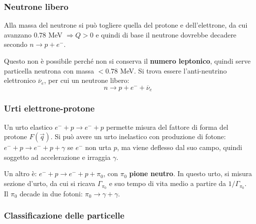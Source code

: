 \documentclass[10pt, a4paper]{scrartcl}
\numberwithin{equation}{subsection}
\theoremstyle{style1}
\begin{document}
\subsubsection{Neutrone libero}

Alla massa del neutrone si pu\`o togliere quella del protone e dell'elettrone, da cui avanzano $0.78$ MeV $\Rightarrow Q>0$ e quindi di base il neutrone dovrebbe decadere secondo $n \to  p + e^-$.

Questo non \`e possibile perch\'e non si conserva il \textbf{numero leptonico}, quindi serve particella neutrona con massa $<0.78$ MeV. Si trova essere l'anti-neutrino elettronico $\overline{\nu }_e$, per cui un neutrone libero:
\begin{equation}
	n \to p+e^- + \overline{\nu }_e
\end{equation}
\subsubsection{Urti elettrone-protone}
Un urto elastico $e^- + p \to e^- + p$ permette misura del fattore di forma del protone $F(\vec{q})$. Si pu\`o avere un urto inelastico con produzione di fotone: $e^- + p \to e^- + p + \gamma$ se $e^-$ non urta $p$, ma viene deflesso dal suo campo, quindi soggetto ad accelerazione e irraggia $\gamma$.

Un altro \`e: $e^- + p \to e^- + p + \pi_0$, con $\pi_0$ \textbf{pione neutro}. In questo urto, si misura sezione d'urto, da cui si ricava $\Gamma_{\pi_0} $ e suo tempo di vita medio a partire da $1 / \Gamma_{\pi_0}  $. Il $\pi_0$ decade in due fotoni: $\pi_0 \to \gamma+ \gamma$.

\subsubsection{Classificazione delle particelle}
\end{document}
